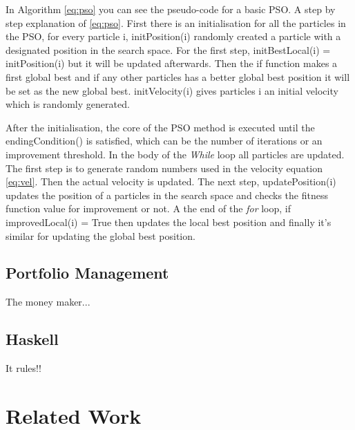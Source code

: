 \documentclass{pdfmx4020}
\begin{document}
    In Algorithm \ref{eq:pso} you can see the pseudo-code for a basic PSO. A step by step explanation of \ref{eq:pso}. First there is an initialisation for all the particles in the PSO, for every particle i, initPosition(i) randomly created a particle with a designated position in the search space. For the first step, initBestLocal(i) = initPosition(i) but it will be updated afterwards. Then the if function makes a first global best and if any other particles has a better global best position it will be set as the new global best. initVelocity(i) gives particles i an initial velocity which is randomly generated. 

    After the initialisation, the core of the PSO method is executed until the endingCondition() is satisfied, which can be the number of iterations or an improvement threshold. In the body of the \textit{While} loop all particles are updated. The first step is to generate random numbers used in the velocity equation \ref{eq:vel}. Then the actual velocity is updated. The next step, updatePosition(i) updates the position of a particles in the search space and checks the fitness function value for improvement or not. A the end of the \textit{for} loop, if improvedLocal(i) = True then updates the local best position and finally it's similar for updating the global best position. 

    

  \section{Portfolio Management} %
  \label{sec:portfolio_management}
    The money maker...

  \section{Haskell} %
  \label{sec:haskell}
    It rules!! 

    


\chapter{Related Work}
\end{document}
